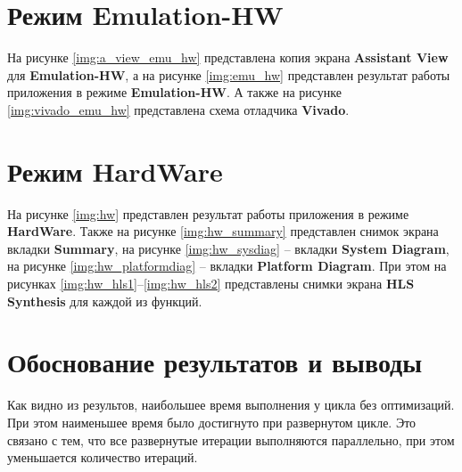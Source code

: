 \section{Режим Emulation-HW}

На рисунке \ref{img:a_view_emu_hw} представлена копия экрана \textbf{Assistant View} для \textbf{Emulation-HW}, а на рисунке \ref{img:emu_hw} представлен результат работы приложения в режиме \textbf{Emulation-HW}. А также на рисунке \ref{img:vivado_emu_hw} представлена схема отладчика \textbf{Vivado}.



\section{Режим HardWare}

На рисунке \ref{img:hw} представлен результат работы приложения в режиме \textbf{HardWare}. Также на рисунке \ref{img:hw_summary} представлен снимок экрана вкладки \textbf{Summary}, на рисунке \ref{img:hw_sysdiag} -- вкладки \textbf{System Diagram}, на рисунке \ref{img:hw_platformdiag} -- вкладки \textbf{Platform Diagram}. При этом на рисунках \ref{img:hw_hls1}--\ref{img:hw_hls2} представлены снимки экрана \textbf{HLS Synthesis} для каждой из функций.






\section{Обоснование результатов и выводы}

Как видно из результов, наибольшее время выполнения у цикла без оптимизаций. При этом наименьшее время было достигнуто при развернутом цикле. Это связано с тем, что все развернутые итерации выполняются параллельно, при этом уменьшается количество итераций.



